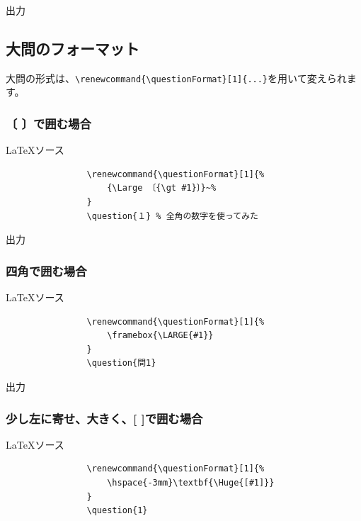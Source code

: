 \documentclass[dvipdfmx,a4j,11pt]{jarticle}
\newenvironment{inputbox}{%
	\begin{itembox}[r]{\LaTeX ソース}
}{
	\end{itembox}
}
\newenvironment{outputbox}{%
	\begin{itembox}[r]{出力}
}{%
	\end{itembox}
}
\begin{document}
	\begin{outputbox}
	\end{outputbox}
	
\subsection{大問のフォーマット}
	大問の形式は、{\tt \verb"\renewcommand{\questionFormat}[1]{...}"}を用いて変えられます。
	\subsubsection{〔 〕で囲む場合}
		\begin{inputbox}
			\begin{verbatim}
				\renewcommand{\questionFormat}[1]{%
					{\Large 〔{\gt #1}〕}~%
				}
				\question{１} % 全角の数字を使ってみた
			\end{verbatim}
		\end{inputbox}
		
		\renewcommand{\questionFormat}[1]{%
			{\Large 〔{\gt #1}〕}~%
		}
		
		\begin{outputbox}
		\end{outputbox}
		

	\subsubsection{四角で囲む場合}
		\begin{inputbox}
			\begin{verbatim}
				\renewcommand{\questionFormat}[1]{%
				    \framebox{\LARGE{#1}}
				}
				\question{問1}
			\end{verbatim}
		\end{inputbox}
		
		\renewcommand{\questionFormat}[1]{%
			\framebox{\LARGE{#1}}
		}
		\begin{outputbox}
		\end{outputbox}
		
	\subsubsection{少し左に寄せ、大きく、[ ]で囲む場合}
		\begin{inputbox}
			\begin{verbatim}
				\renewcommand{\questionFormat}[1]{%
				    \hspace{-3mm}\textbf{\Huge{[#1]}}
				}
				\question{1}
			\end{verbatim}
		\end{inputbox}
		\renewcommand{\questionFormat}[1]{%
			\hspace{-3mm}\textbf{\Huge{[#1]}}
		}
\end{document}
